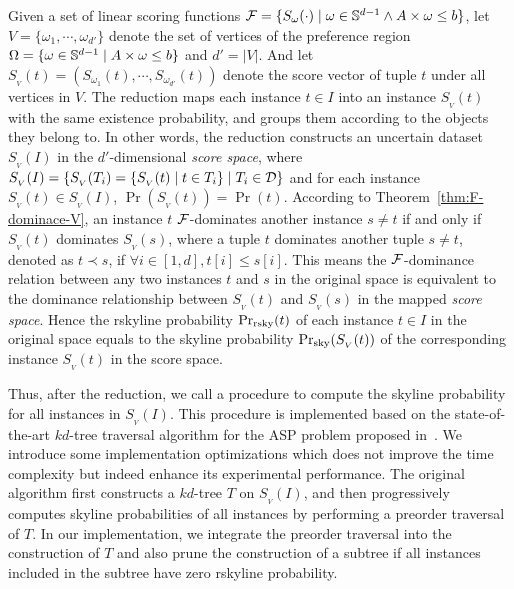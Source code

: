 Given a set of linear scoring functions $\mathcal{F} = \{S_\omega(\cdot) \mid \omega \in \mathbb{S}^{d-1} \wedge A \times \omega \le b\}$, let $V = \{\omega_1, \cdots, \omega_{d'}\}$ denote the set of vertices of the preference region $\Omega = \{\omega \in \mathbb{S}^{d-1} \mid A \times \omega \le b\}$ and $d' = |V|$.
And let $S_{_V}(t) = (S_{\omega_1}(t), \cdots, S_{\omega_{d'}}(t))$ denote the score vector of tuple $t$ under all vertices in $V$.
The reduction maps each instance $t \in I$ into an instance $S_{_V}(t)$ with the same existence probability, and groups them according to the objects they belong to.
In other words, the reduction constructs an uncertain dataset $S_{_V}(I)$ in the $d'$-dimensional \textit{score space}, where $S_{_V}(I) = \{S_{_V}(T_i) = \{S_{_V}(t) \mid t \in T_i\} \mid T_i \in \mathcal{D}\}$ and for each instance $S_{_V}(t) \in S_{_V}(I)$, $\Pr(S_{_V}(t)) = \Pr(t)$.
According to Theorem~\ref{thm:F-dominace-V}, an instance $t$ $\mathcal{F}$-dominates another instance $s \ne t$ if and only if $S_{_V}(t)$ dominates $S_{_V}(s)$, where a tuple $t$ dominates another tuple $s \ne t$, denoted as $t \prec s$, if $\forall i \in [1, d], t[i] \le s[i]$.
This means the $\mathcal{F}$-dominance relation between any two instances $t$ and $s$ in the original space is equivalent to the dominance relationship between $S_{_V}(t)$ and $S_{_V}(s)$ in the mapped \textit{score space}.
Hence the rskyline probability $\Pr_{\rm rsky}(t)$ of each instance $t \in I$ in the original space equals to the skyline probability $\Pr_{\rm sky}(S_{_V}(t))$ of the corresponding instance $S_{_V}(t)$ in the score space.

Thus, after the reduction, we call a procedure \skyprob to compute the skyline probability for all instances in $S_{_V}(I)$.
This procedure is implemented based on the state-of-the-art $kd$-tree traversal algorithm for the ASP problem proposed in~\cite{DBLP:journals/mst/AfshaniAALP13}.
We introduce some implementation optimizations which does not improve the time complexity but indeed enhance its experimental performance.
The original algorithm first constructs a $kd$-tree $T$ on $S_{_V}(I)$, and then progressively computes skyline probabilities of all instances by performing a preorder traversal of $T$.
In our implementation, we integrate the preorder traversal into the construction of $T$ and also prune the construction of a subtree if all instances included in the subtree have zero rskyline probability.

